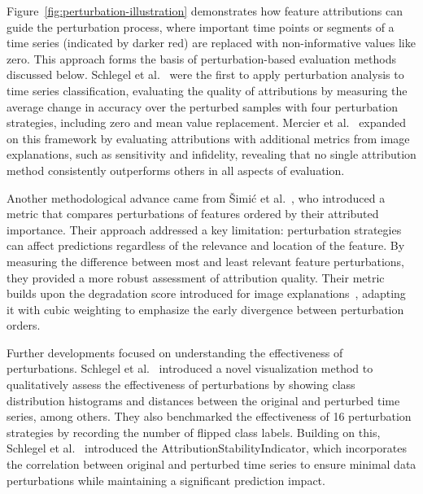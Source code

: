 

Figure~\ref{fig:perturbation-illustration} demonstrates how feature attributions can guide the perturbation process, where important time points or segments of a time series (indicated by darker red) are replaced with non-informative values like zero. This approach forms the basis of perturbation-based evaluation methods discussed below.
Schlegel et al.~\cite{schlegel.etal_2019_rigorous} were the first to apply perturbation analysis to time series classification, evaluating the quality of attributions by measuring the average change in accuracy over the perturbed samples with four perturbation strategies, including zero and mean value replacement.
Mercier et al.~\cite{mercier.etal_2022_time} expanded on this framework by evaluating attributions with additional metrics from image explanations, such as sensitivity and infidelity, revealing that no single attribution method consistently outperforms others in all aspects of evaluation.



Another methodological advance came from Šimić et al.~\cite{simic.etal_2022_perturbation}, who introduced a metric that compares perturbations of features ordered by their attributed importance. Their approach addressed a key limitation: perturbation strategies can affect predictions regardless of the relevance and location of the feature. By measuring the difference between most and least relevant feature perturbations, they provided a more robust assessment of attribution quality. Their metric builds upon the degradation score introduced for image explanations~\cite{schulz.etal_2020_restricting}, adapting it with cubic weighting to emphasize the early divergence between perturbation orders.

Further developments focused on understanding the effectiveness of perturbations. 
Schlegel et al.~\cite{schlegel.keim_2023_deep} introduced a novel visualization method to qualitatively assess the effectiveness of perturbations by showing class distribution histograms and distances between the original and perturbed time series, among others. They also benchmarked the effectiveness of 16 perturbation strategies by recording the number of flipped class labels.
Building on this, Schlegel et al.~\cite{schlegel.keim_2023_introducing} introduced the AttributionStabilityIndicator, which incorporates the correlation between original and perturbed time series to ensure minimal data perturbations while maintaining a significant prediction impact.

